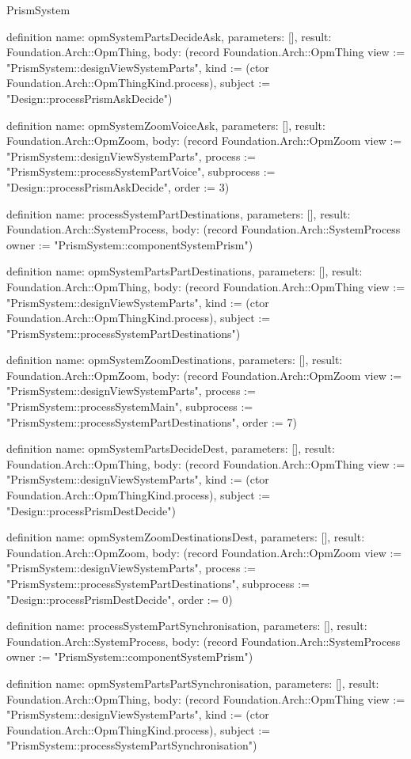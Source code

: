 \begin{lexlean}{PrismSystem}
\begin{semanticmodule}
definition{
  name: opmSystemPartsDecideAsk,
  parameters: [],
  result: Foundation.Arch::OpmThing,
  body: (record Foundation.Arch::OpmThing {view := "PrismSystem::designViewSystemParts", kind := (ctor Foundation.Arch::OpmThingKind.process), subject := "Design::processPrismAskDecide"})
}

definition{
  name: opmSystemZoomVoiceAsk,
  parameters: [],
  result: Foundation.Arch::OpmZoom,
  body: (record Foundation.Arch::OpmZoom {view := "PrismSystem::designViewSystemParts", process := "PrismSystem::processSystemPartVoice", subprocess := "Design::processPrismAskDecide", order := 3})
}

definition{
  name: processSystemPartDestinations,
  parameters: [],
  result: Foundation.Arch::SystemProcess,
  body: (record Foundation.Arch::SystemProcess {owner := "PrismSystem::componentSystemPrism"})
}

definition{
  name: opmSystemPartsPartDestinations,
  parameters: [],
  result: Foundation.Arch::OpmThing,
  body: (record Foundation.Arch::OpmThing {view := "PrismSystem::designViewSystemParts", kind := (ctor Foundation.Arch::OpmThingKind.process), subject := "PrismSystem::processSystemPartDestinations"})
}

definition{
  name: opmSystemZoomDestinations,
  parameters: [],
  result: Foundation.Arch::OpmZoom,
  body: (record Foundation.Arch::OpmZoom {view := "PrismSystem::designViewSystemParts", process := "PrismSystem::processSystemMain", subprocess := "PrismSystem::processSystemPartDestinations", order := 7})
}

definition{
  name: opmSystemPartsDecideDest,
  parameters: [],
  result: Foundation.Arch::OpmThing,
  body: (record Foundation.Arch::OpmThing {view := "PrismSystem::designViewSystemParts", kind := (ctor Foundation.Arch::OpmThingKind.process), subject := "Design::processPrismDestDecide"})
}

definition{
  name: opmSystemZoomDestinationsDest,
  parameters: [],
  result: Foundation.Arch::OpmZoom,
  body: (record Foundation.Arch::OpmZoom {view := "PrismSystem::designViewSystemParts", process := "PrismSystem::processSystemPartDestinations", subprocess := "Design::processPrismDestDecide", order := 0})
}

definition{
  name: processSystemPartSynchronisation,
  parameters: [],
  result: Foundation.Arch::SystemProcess,
  body: (record Foundation.Arch::SystemProcess {owner := "PrismSystem::componentSystemPrism"})
}

definition{
  name: opmSystemPartsPartSynchronisation,
  parameters: [],
  result: Foundation.Arch::OpmThing,
  body: (record Foundation.Arch::OpmThing {view := "PrismSystem::designViewSystemParts", kind := (ctor Foundation.Arch::OpmThingKind.process), subject := "PrismSystem::processSystemPartSynchronisation"})
}


\end{semanticmodule}
\end{lexlean}
